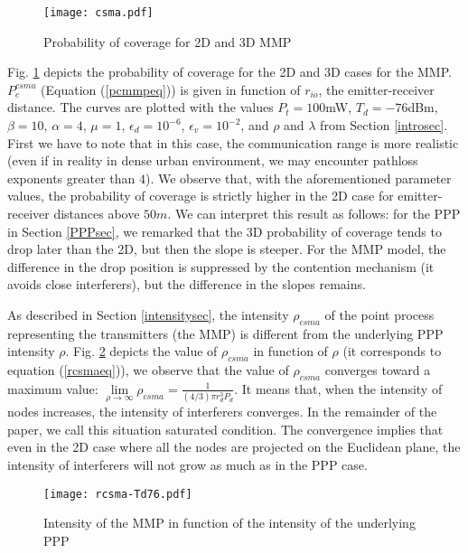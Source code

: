 \documentclass{sig-alternate-05-2015}
\begin{document}
\begin{figure}[ht]
  \centering
  \texttt{[image: csma.pdf]}
  \caption{Probability of coverage for 2D and 3D MMP}
  \label{csmafig}
\end{figure}

Fig. \ref{csmafig} depicts the probability of coverage for the 2D and 3D cases for the MMP. $P_c^{csma}$ (Equation (\ref{pcmmpeq})) is given in function of $r_{io}$, the emitter-receiver distance. The curves are plotted with the values $P_t=100$mW, $T_d=-76$dBm, $\beta=10$, $\alpha=4$, $\mu=1$, $\epsilon_d=10^{-6}$, $\epsilon_v=10^{-2}$, and $\rho$ and $\lambda$ from Section \ref{introsec}. First we have to note that in this case, the communication range is more realistic (even if in reality in dense urban environment, we may encounter pathloss exponents greater than $4$). We observe that, with the aforementioned parameter values, the probability of coverage is strictly higher in the 2D case for emitter-receiver distances above $50m$. We can interpret this result as follows: for the PPP in Section \ref{PPPsec}, we remarked that the 3D probability of coverage tends to drop later than the 2D, but then the slope is steeper. For the MMP model, the difference in the drop position is suppressed by the contention mechanism (it avoids close interferers), but the difference in the slopes remains.


As described in Section \ref{intensitysec}, the intensity $\rho_{csma}$ of the point process representing the transmitters (the MMP) is different from the underlying PPP intensity $\rho$. Fig. \ref{rcsmafig} depicts the value of $\rho_{csma}$ in function of $\rho$ (it corresponds to equation (\ref{rcsmaeq})), we observe that the value of $\rho_{csma}$ converges toward a maximum value: $\lim\limits_{\rho \to \infty} \rho_{csma} = \frac{1}{(4/3) \pi r_d^3 P_d} $. It means that, when the intensity of nodes increases, the intensity of interferers converges. In the remainder of the paper, we call this situation saturated condition. The convergence implies that even in the 2D case where all the nodes are projected on the Euclidean plane, the intensity of interferers will not grow as much as in the PPP case.

\begin{figure}[ht]
  \centering
  \texttt{[image: rcsma-Td76.pdf]}
  \caption{Intensity of the MMP in function of the intensity of the underlying PPP}
  \label{rcsmafig}
\end{figure}
\end{document}
